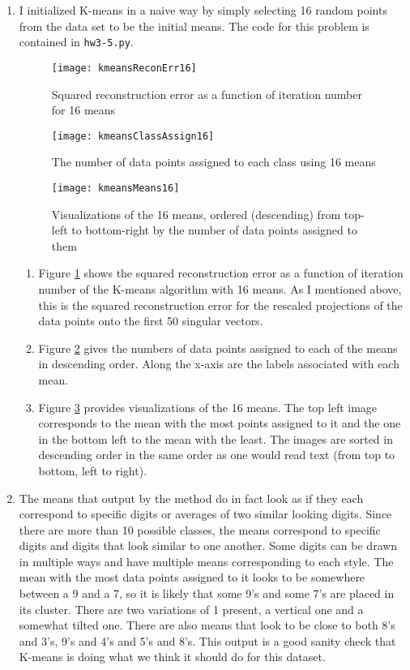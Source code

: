 \documentclass{article}
\begin{document}
\begin{enumerate}
	\item I initialized K-means in a naive way by simply selecting 16 random points from the data set to be the initial means. The code for this problem is contained in \texttt{hw3-5.py}.
	\begin{figure}
		\centering
	    	\texttt{[image: kmeansReconErr16]}
	    	\caption{Squared reconstruction error as a function of iteration number for 16 means}
	    	\label{fig:kmErr16}
	\end{figure}
	\begin{figure}
		\centering
	    	\texttt{[image: kmeansClassAssign16]}
	    	\caption{The number of data points assigned to each class using 16 means}
	    	\label{fig:kmAs16}
	\end{figure}
	\begin{figure}
		\centering
		\texttt{[image: kmeansMeans16]}
		\caption{Visualizations of the 16 means, ordered (descending) from top-left to bottom-right by the number of data points assigned to them}
		\label{fig:kmVis16}
	\end{figure}

	\begin{enumerate}
		\item Figure \ref{fig:kmErr16} shows the squared reconstruction error as a function of iteration number of the K-means algorithm with 16 means. As I mentioned above, this is the squared reconstruction error for the rescaled projections of the data points onto the first 50 singular vectors.
		\item Figure \ref{fig:kmAs16} gives the numbers of data points assigned to each of the means in descending order. Along the x-axis are the labels associated with each mean.
		\item Figure \ref{fig:kmVis16} provides visualizations of the 16 means. The top left image corresponds to the mean with the most points assigned to it and the one in the bottom left to the mean with the least. The images are sorted in descending order in the same order as one would read text (from top to bottom, left to right).
	\end{enumerate}

	\item The means that output by the method do in fact look as if they each correspond to specific digits or averages of two similar looking digits. Since there are more than 10 possible classes, the means correspond to specific digits and digits that look similar to one another. Some digits can be drawn in multiple ways and have multiple means corresponding to each style. The mean with the most data points assigned to it looks to be somewhere between a 9 and a 7, so it is likely that some 9's and some 7's are placed in its cluster. There are two variations of 1 present, a vertical one and a somewhat tilted one. There are also means that look to be close to both 8's and 3's, 9's and 4's and 5's and 8's. This output is a good sanity check that K-means is doing what we think it should do for this dataset.


\end{enumerate}
\end{document}
